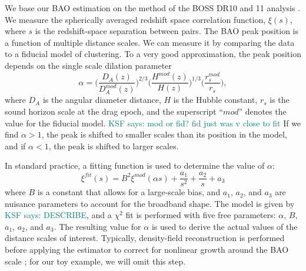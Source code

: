 \documentclass[modern]{aastex62}
\newcommand{\KSF}[1]{\textcolor{teal}{KSF says: #1}}
\begin{document}
We base our BAO estimation on the method of the BOSS DR10 and 11 analysis \citep{Anderson2014}.
We measure the spherically averaged redshift space correlation function, $\xi(s)$, where $s$ is the redshift-space separation between pairs.
The BAO peak position is a function of multiple distance scales.
We can measure it by comparing the data to a fiducial model of clustering.
To a very good approximation, the peak position depends on the single scale dilation parameter
\begin{equation}
\alpha = \Bigg( \frac{D_A(z)}{D_A^{mod}(z)} \Bigg)^{2/3} \Bigg( \frac{H^{mod}(z)}{H(z)} \Bigg)^{1/3} \Bigg( \frac{r_s^{mod}}{r_s} \Bigg),
\end{equation}
where $D_A$ is the angular diameter distance, $H$ is the Hubble constant, $r_s$ is the sound horizon scale at the drag epoch, and the superscript ``$mod$'' denotes the value for the fiducial model. \KSF{mod or fid? fid just was v close to fit}
If we find $\alpha>1$, the peak is shifted to smaller scales than its position in the model, and if $\alpha<1$, the peak is shifted to larger scales.


In standard practice, a fitting function is used to determine the value of $\alpha$:
\begin{equation}
\xi^{fit}(s) = B^2 \xi^{mod}(\alpha s) + \frac{a_1}{s^2} + \frac{a_2}{s} + a_3
\end{equation}
where $B$ is a constant that allows for a large-scale bias, and $a_1$, $a_2$, and $a_3$ are nuisance parameters to account for the broadband shape.
The model is given by \KSF{DESCRIBE}, and a $\chi^2$ fit is performed with five free parameters: $\alpha$, $B$, $a_1$, $a_2$, and $a_3$.
The resulting value for $\alpha$ is used to derive the actual values of the distance scales of interest.
Typically, density-field reconstruction is performed before applying the estimator to correct for nonlinear growth around the BAO scale \citep{Eisenstein2007}; for our toy example, we will omit this step.
\end{document}
